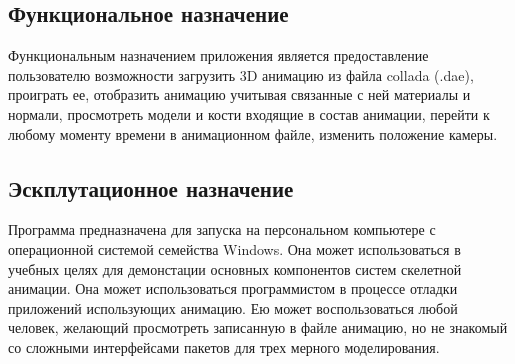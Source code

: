 \subsection{Функциональное назначение}
Функциональным назначением приложения является предоставление пользователю возможности загрузить 3D анимацию из файла collada (.dae), проиграть ее, отобразить анимацию учитывая связанные с ней материалы и нормали, просмотреть модели и кости входящие в состав анимации, перейти к любому моменту времени в анимационном файле, изменить положение камеры.

\subsection{Эскплутационное назначение}
Программа предназначена для запуска на персональном компьютере с операционной системой семейства Windows. Она может использоваться в учебных целях для демонстации основных компонентов систем скелетной анимации. Она может использоваться программистом в процессе отладки приложений использующих анимацию. Ею может воспользоваться любой человек, желающий просмотреть записанную в файле анимацию, но не знакомый со сложными интерфейсами пакетов для трех мерного моделирования.
